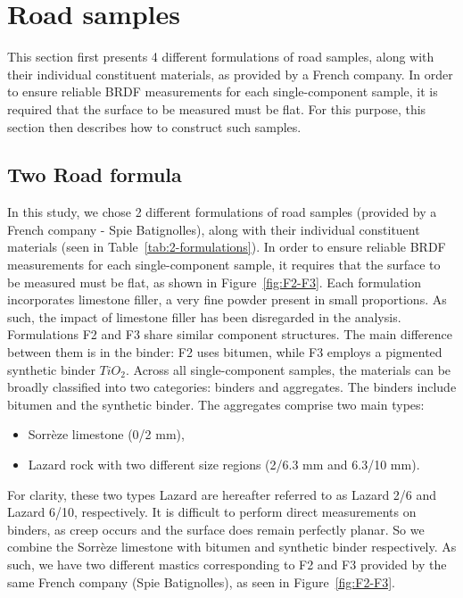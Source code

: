 \section{Road samples}

This section first presents 4 different formulations of road samples, along with their individual constituent materials, as provided by a French company.
In order to ensure reliable BRDF measurements for each single-component sample, it is required that the surface to be measured must be flat.
For this purpose, this section then describes how to construct such samples.


\subsection{Two Road formula}

In this study, we chose 2 different formulations of road samples (provided by a French company - Spie Batignolles), along with their individual constituent materials (seen in Table~\ref{tab:2-formulations}).
In order to ensure reliable BRDF measurements for each single-component sample, it requires that the surface to be measured must be flat, as shown in Figure~\ref{fig:F2-F3}.
Each formulation incorporates limestone filler, a very fine powder present in small proportions.
As such, the impact of limestone filler has been disregarded in the analysis.
Formulations F2 and F3 share similar component structures.
The main difference between them is in the binder: F2 uses bitumen, while F3 employs a pigmented synthetic binder $TiO_2$.
Across all single-component samples, the materials can be broadly classified into two categories: binders and aggregates.
The binders include bitumen and the synthetic binder.
The aggregates comprise two main types:
\begin{itemize}
    \item Sorrèze limestone (0/2 mm),
    \item Lazard rock with two different size regions (2/6.3 mm and 6.3/10 mm).
\end{itemize}
For clarity, these two types Lazard are hereafter referred to as Lazard 2/6 and Lazard 6/10, respectively.
It is difficult to perform direct measurements on binders, as creep occurs and the surface does remain perfectly planar.
So we combine the Sorrèze limestone with bitumen and synthetic binder respectively.
As such, we have two different mastics corresponding to F2 and F3 provided by the same French company (Spie Batignolles), as seen in Figure~\ref{fig:F2-F3}.

